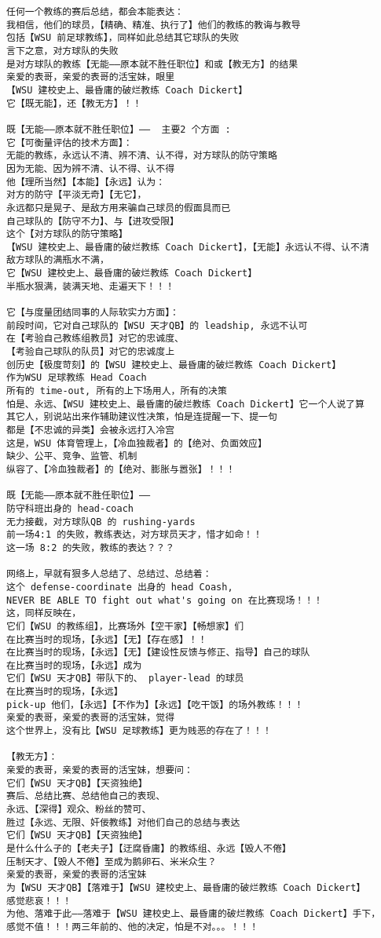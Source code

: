 \documentclass[9pt, b5paper]{article}
\begin{document}
\begin{verbatim}
任何一个教练的赛后总结，都会本能表达：
我相信，他们的球员，【精确、精准、执行了】他们的教练的教诲与教导
包括【WSU 前足球教练】，同样如此总结其它球队的失败
言下之意，对方球队的失败
是对方球队的教练【无能——原本就不胜任职位】和或【教无方】的结果
亲爱的表哥，亲爱的表哥的活宝妹，眼里
【WSU 建校史上、最昏庸的破烂教练 Coach Dickert】
它【既无能】，还【教无方】！！

既【无能——原本就不胜任职位】——  主要2 个方面 :
它【可衡量评估的技术方面】：
无能的教练，永远认不清、辨不清、认不得，对方球队的防守策略
因为无能、因为辨不清、认不得、认不得
他【理所当然】【本能】【永远】认为：
对方的防守【平淡无奇】【无它】，
永远都只是晃子、是敌方用来骗自己球员的假面具而已
自己球队的【防守不力】、与【进攻受限】
这个【对方球队的防守策略】
【WSU 建校史上、最昏庸的破烂教练 Coach Dickert】，【无能】永远认不得、认不清
敌方球队的满瓶水不满，
它【WSU 建校史上、最昏庸的破烂教练 Coach Dickert】
半瓶水狠满，装满天地、走遍天下！！！

它【与度量团结同事的人际软实力方面】：
前段时间，它对自己球队的【WSU 天才QB】的 leadship, 永远不认可
在【考验自己教练组教员】对它的忠诚度、
【考验自己球队的队员】对它的忠诚度上
创历史【极度苛刻】的【WSU 建校史上、最昏庸的破烂教练 Coach Dickert】
作为WSU 足球教练 Head Coach
所有的 time-out, 所有的上下场用人，所有的决策
怕是、永远、【WSU 建校史上、最昏庸的破烂教练 Coach Dickert】它一个人说了算
其它人，别说站出来作辅助建议性决策，怕是连提醒一下、提一句
都是【不忠诚的异类】会被永远打入冷宫
这是，WSU 体育管理上，【冷血独裁者】的【绝对、负面效应】
缺少、公平、竞争、监管、机制
纵容了、【冷血独裁者】的【绝对、膨胀与嚣张】！！！

既【无能——原本就不胜任职位】——
防守科班出身的 head-coach
无力接截，对方球队QB 的 rushing-yards
前一场4:1 的失败，教练表达，对方球员天才，惜才如命！！
这一场 8:2 的失败，教练的表达？？？

网络上，早就有狠多人总结了、总结过、总结着：
这个 defense-coordinate 出身的 head Coash,
NEVER BE ABLE TO fight out what's going on 在比赛现场！！！
这，同样反映在，
它们【WSU 的教练组】，比赛场外【空干家】【畅想家】们
在比赛当时的现场，【永远】【无】【存在感】！！
在比赛当时的现场，【永远】【无】【建设性反馈与修正、指导】自己的球队
在比赛当时的现场，【永远】成为
它们【WSU 天才QB】带队下的、 player-lead 的球员
在比赛当时的现场，【永远】
pick-up 他们，【永远】【不作为】【永远】【吃干饭】的场外教练！！！
亲爱的表哥，亲爱的表哥的活宝妹，觉得
这个世界上，没有比【WSU 足球教练】更为贱恶的存在了！！！

【教无方】：
亲爱的表哥，亲爱的表哥的活宝妹，想要问：
它们【WSU 天才QB】【天资独绝】
赛后、总结比赛、总结他自己的表现、
永远、【深得】观众、粉丝的赞可、
胜过【永远、无限、奸佞教练】对他们自己的总结与表达
它们【WSU 天才QB】【天资独绝】
是什么什么子的【老夫子】【迂腐昏庸】的教练组、永远【毁人不倦】
压制天才、【毁人不倦】至成为鹅卵石、米米众生？
亲爱的表哥，亲爱的表哥的活宝妹
为【WSU 天才QB】【落难于】【WSU 建校史上、最昏庸的破烂教练 Coach Dickert】
感觉悲哀！！！
为他、落难于此——落难于【WSU 建校史上、最昏庸的破烂教练 Coach Dickert】手下，
感觉不值！！！两三年前的、他的决定，怕是不对。。。！！！


\end{verbatim}
\end{document}
